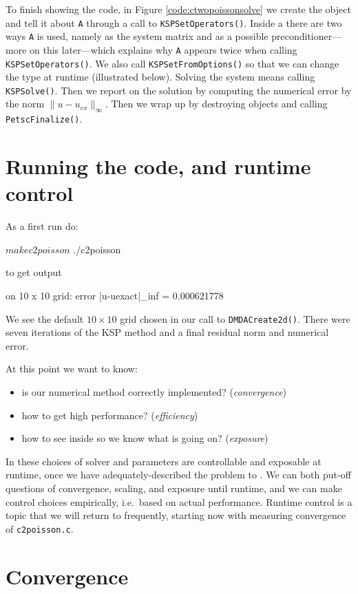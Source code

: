 To finish showing the code, in Figure \ref{code:ctwopoissonsolve} we create the \pKSP object and tell it about \texttt{A} through a call to \texttt{KSPSetOperators()}.  Inside a \pKSP there are two ways \texttt{A} is used, namely as the system matrix and as a possible preconditioner---more on this later---which explains why \texttt{A} appears twice when calling \texttt{KSPSetOperators()}.  We also call \texttt{KSPSetFromOptions()} so that we can change the \pKSP type at runtime (illustrated below).  Solving the system means calling \texttt{KSPSolve()}.  Then we report on the solution by computing the numerical error by the norm $\|u-u_{ex}\|_\infty$.  Then we wrap up by destroying objects and calling \texttt{PetscFinalize()}.


\section{Running the code, and runtime control}

As a first run do:
\begin{cline}
$ make c2poisson
$ ./c2poisson
\end{cline}
to get output
\begin{cline}
on 10 x 10 grid:  error |u-uexact|_inf = 0.000621778
\end{cline}
We see the default $10\times 10$ grid chosen in our call to \texttt{DMDACreate2d()}. There were seven iterations of the KSP method and a final residual norm and numerical error.

At this point we want to know:\begin{itemize}
\item is our numerical method correctly implemented? (\emph{convergence})
\item how to get high performance? (\emph{efficiency})
\item how to see inside \PETSc so we know what is going on? (\emph{exposure})
\end{itemize}
In \PETSc these choices of solver and parameters are controllable and exposable at runtime, once we have adequately-described the problem to \PETSc.  We can both put-off questions of convergence, scaling, and exposure until runtime, and we can make control choices empirically, i.e.~based on actual performance.  Runtime control is a topic that we will return to frequently, starting now with measuring convergence of \texttt{c2poisson.c}.


\section{Convergence}

